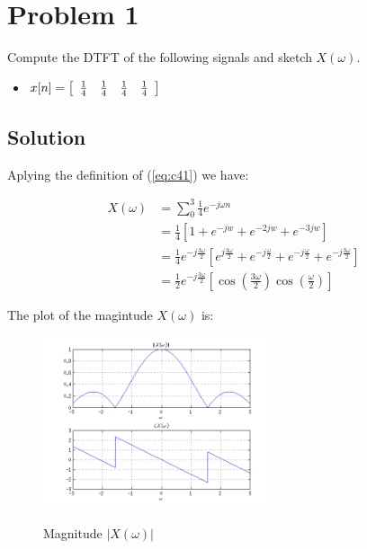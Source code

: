 \section*{Problem 1}

Compute the DTFT of the following signals and sketch $X(\omega)$.

\begin{itemize}
\item 
$x[n] =
\left[
\begin{array}{c c c c}
 \frac{1}{4}&  \frac{1}{4}& \frac{1}{4}& \frac{1}{4}
 \end{array}
 \right]
$
\end{itemize} 

\subsection*{Solution}

Aplying the definition of (\ref{eq:c41}) we have:

\begin{equation*}
\begin{aligned}
X(\omega) &= \displaystyle\sum_{0}^{3} \frac{1}{4} e^{-j \omega n} \\
&= \frac{1}{4} [1 + e^{-jw} + e^{-2jw} + e^{-3jw}] \\
&= \frac{1}{4} e^{-j \frac{3 \omega}{2}}
		[e^{j \frac{3 \omega}{2}} + e^{-j \frac{\omega}{2}} + 
		 e^{- j \frac{\omega}{2}} + e^{-j \frac{3 \omega}{2}} ] \\
&= \frac{1}{2}  e^{-j \frac{3 \omega}{2}} [\cos(\frac{3 \omega}{2})\cos(\frac{\omega}{2})]
\end{aligned}
\end{equation*} 

The plot of the magintude $X(\omega)$ is:

\begin{figure}[H]
\caption{Magnitude $|X(\omega)|$}
\centering
\includegraphics[width=0.6\textwidth]{figs/c4p1a.png}
\label{fig:c4p1a}
\end{figure} 

